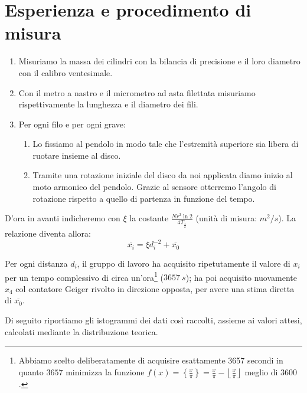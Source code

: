 \documentclass{article}
\begin{document}
\section{Esperienza e procedimento di misura}

\begin{enumerate}
    \item
        Misuriamo la massa dei cilindri con la bilancia di precisione
        e il loro diametro con il calibro ventesimale.
    \item
        Con il metro a nastro e il micrometro ad asta filettata misuriamo
        rispettivamente la lunghezza e il diametro dei fili.
    \item 
        Per ogni filo e per ogni grave:
    \begin{enumerate}
        \item
            Lo fissiamo al pendolo in modo tale che l'estremità
            superiore sia libera di ruotare insieme al disco.
        \item
            Tramite una rotazione iniziale del disco da noi applicata
            diamo inizio al moto armonico del pendolo.
            Grazie al sensore otterremo l'angolo di rotazione rispetto
            a quello di partenza in funzione del tempo.
    \end{enumerate}
\end{enumerate}









D'ora in avanti indicheremo con $\xi$ la costante $\frac{Nr^2\ln{2}}{4T_\frac{1}{2}}$
(unità di misura: $\unit{m^2\per s}$).
La relazione diventa allora:
\[\overline{x_i} = \xi d_i^{-2} + \overline{x_0}\]

Per ogni distanza $d_i$, il gruppo di lavoro ha acquisito ripetutamente il valore di
$x_i$ per un tempo complessivo di circa un'ora\footnote{
    Abbiamo scelto deliberatamente di acquisire esattamente 3657 secondi in quanto
    $3657$ minimizza la funzione
    $f(x)=\left\{\frac{x}{\pi}\right\}=\frac{x}{\pi} - \left\lfloor\frac{x}{\pi}\right\rfloor$
    meglio di $3600$.
} ($\qty{3657}{s}$); ha poi acquisito nuovamente $x_4$ col contatore Geiger rivolto in
direzione opposta, per avere una stima diretta di $\overline{x_0}$.

Di seguito riportiamo gli istogrammi dei dati così raccolti,
assieme ai valori attesi, calcolati mediante la distribuzione teorica.
\end{document}

